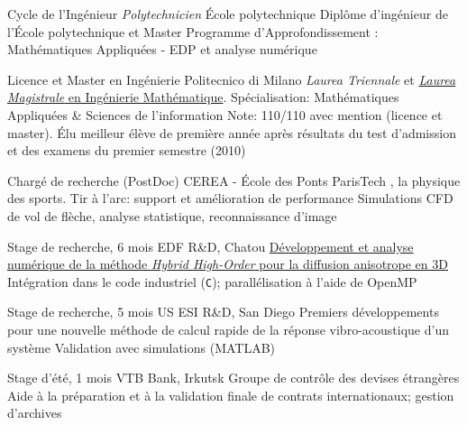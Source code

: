 \documentclass[french]{RMcv}
\begin{document}

%
%
        {Cycle de l'Ing\'enieur \textit{Polytechnicien}}%
        {\'Ecole polytechnique}%
        {Dipl\^ome d'ing\'enieur de l'\'Ecole polytechnique et Master}%
        {Programme d'Approfondissement : Math\'ematiques Appliqu\'ees - EDP et analyse num\'erique}


%
%
        {Licence et Master en Ing\'enierie}%
        {Politecnico di Milano}%
        {\emph{Laurea Triennale} et \href{\tesilink}{\emph{Laurea Magistrale} en Ing\'enierie Math\'ematique}. Sp\'ecialisation: Math\'ematiques Appliqu\'ees \& Sciences de l'information}%
        {Note: 110/110 avec mention (licence et master). \'Elu meilleur \'el\`eve de premi\`ere ann\'ee apr\`es r\'esultats du test d'admission et des examens du premier semestre (2010)}

\vspace{8pt}


%
        {Charg\'e de recherche (PostDoc)}%
        {CEREA - \'Ecole des Ponts ParisTech}%
        {\SciencesJOhref{}, la physique des sports. Tir \`a l'arc: support et am\'elioration de performance}%
        {Simulations CFD de vol de fl\`eche, analyse statistique, reconnaissance d'image}

%
%
        {Stage de recherche, 6 mois}%
        {EDF R\&D, Chatou}%
        {\href{\tesilink}{D\'eveloppement et analyse num\'erique de la m\'ethode \emph{Hybrid High-Order} pour la diffusion anisotrope en 3D}}%
        {Int\'egration dans le code industriel \cs{} (\texttt{C}); parall\'elisation \`a l'aide de OpenMP}


%
%
        {Stage de recherche, 5 mois}%
        {US ESI R\&D, San Diego}%
        {Premiers d\'eveloppements pour une nouvelle m\'ethode de calcul rapide de la r\'eponse vibro-acoustique d'un syst\`eme}%
        {Validation avec simulations (MATLAB)}


%
%
        {Stage d'\'et\'e, 1 mois}%
        {VTB Bank, Irkutsk}%
        {Groupe de contr\^ole des devises \'etrang\`eres}%
        {Aide \`a la pr\'eparation et \`a la validation finale de contrats internationaux; gestion d'archives}
\end{document}
